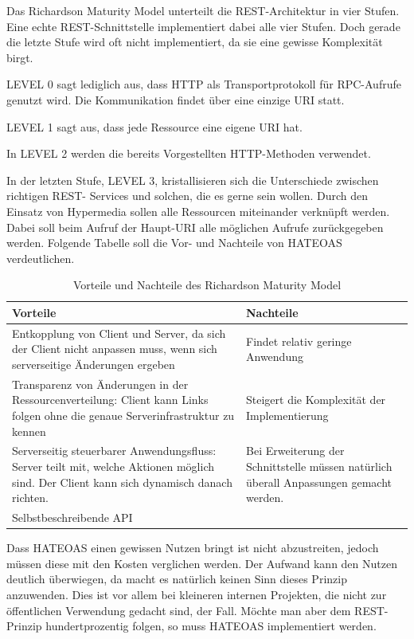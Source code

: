 Das Richardson Maturity Model unterteilt die \ac{REST}-Architektur in vier Stufen. Eine echte
\ac{REST}-Schnittstelle implementiert dabei alle vier Stufen. Doch gerade die letzte Stufe wird oft
nicht implementiert, da sie eine gewisse Komplexität birgt.

LEVEL 0 sagt lediglich aus, dass \ac{HTTP} als Transportprotokoll für RPC-Aufrufe genutzt wird.
Die Kommunikation findet über eine einzige \ac{URI} statt.

LEVEL 1 sagt aus, dass jede Ressource eine eigene \ac{URI} hat.

In LEVEL 2 werden die bereits Vorgestellten \ac{HTTP}-Methoden verwendet.

In der letzten Stufe, LEVEL 3, kristallisieren sich die Unterschiede zwischen richtigen \ac{REST}-
Services und solchen, die es gerne sein wollen. Durch den Einsatz von Hypermedia sollen alle
Ressourcen miteinander verknüpft werden. Dabei soll beim Aufruf der Haupt-\ac{URI} alle
möglichen Aufrufe zurückgegeben werden. Folgende Tabelle soll die Vor- und Nachteile von
HATEOAS verdeutlichen.
\newline

\begin{table}[H]
	\begin{tabular}{ | p{7cm} | p{7cm} | }	
		\hline	
		Vorteile & Nachteile \\  \hline	
		Entkopplung von Client und Server, da sich der Client nicht anpassen muss,
		wenn sich serverseitige Änderungen ergeben & 
		Findet relativ geringe Anwendung	 \\ \hline
		Transparenz von Änderungen in der Ressourcenverteilung: 
		Client kann Links folgen ohne die genaue Serverinfrastruktur zu kennen 
		& Steigert die Komplexität der Implementierung \\ \hline
		Serverseitig steuerbarer Anwendungsfluss: Server teilt mit, welche Aktionen möglich sind. 
		Der Client kann sich dynamisch danach richten.
		 & Bei Erweiterung der Schnittstelle müssen natürlich überall Anpassungen gemacht werden. \\ \hline
		Selbstbeschreibende API &  \\ \hline
	\end{tabular}
	\caption{Vorteile und Nachteile des Richardson Maturity Model}
\end{table}

Dass HATEOAS einen gewissen Nutzen bringt ist nicht abzustreiten, jedoch müssen diese mit den Kosten verglichen werden. Der Aufwand kann den Nutzen deutlich überwiegen, da macht es natürlich keinen Sinn dieses Prinzip anzuwenden. Dies ist vor allem bei kleineren internen Projekten, die nicht zur öffentlichen Verwendung gedacht sind, der Fall. Möchte man aber dem \ac{REST}-Prinzip hundertprozentig folgen, so muss HATEOAS implementiert werden.


